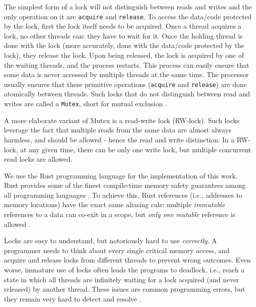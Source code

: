 The simplest form of a lock will not distinguish between reads and writes and the only operation on
it are \texttt{acquire} and \texttt{release}. To access the data/code protected by the lock, first the
lock itself needs to be acquired. Once a thread acquires a lock, no other threads can: they have
to wait for it. Once the holding thread is done with the lock (more accurately, done with the data/code
protected by the lock), they release the lock. Upon being released, the lock is acquired by one of the waiting threads, and the process restarts. This process can easily ensure that some data is never accessed by
multiple threads at the same time. The processor usually ensures that these primitive operations
(\texttt{acquire} and \texttt{release}) are done atomically between threads. Such locks that do not
distinguish between read and writes are called a \texttt{Mutex}, short for mutual exclusion
\cite{guerraouiLockUnlockThat2019}.

A more elaborate variant of Mutex is a read-write lock (RW-lock). Such locks leverage the
fact that multiple reads from the same data are almost always harmless, and should be allowed - hence
the read and write distinction. In a RW-lock, at any given time, there can be only one write
lock, but multiple concurrent read locks are allowed.

\begin{remark}
	We use the Rust programming language for the implementation of this work. Rust provides some of
	the finest compile-time memory safety guarantees among all programming languages
	\cite{jungRustBeltSecuringFoundations2017}. To achieve this, Rust references (i.e., addresses to
	memory locations) have the exact same aliasing rule: multiple \textit{immutable} references to a
	data can co-exit in a scope, but \textit{only one} \textit{mutable} reference is allowed
	\cite{weissOxideEssenceRust2020}.
\end{remark}

Locks are easy to understand, but notoriously hard to use \textit{correctly}. A programmer needs to
think about every single critical memory access, and acquire and release locks from different
threads to prevent wrong outcomes. Even worse, immature use of locks often leads the programs to
deadlock, i.e., reach a  state in which all threads are infinitely waiting for a lock acquired (and
never released) by another thread. These issues are common programming errors, but they remain very
hard to detect and resolve \cite{herlihyArtMultiprocessorProgramming2012}.

